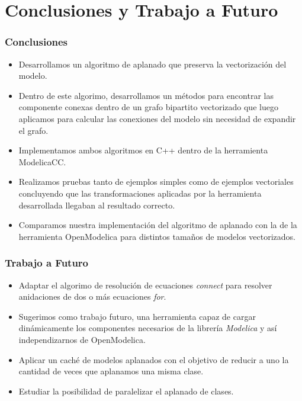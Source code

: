\section{Conclusiones y Trabajo a Futuro}
\begin{frame}
\frametitle{Conclusiones}
\begin{itemize}
 \item Desarrollamos un algoritmo de aplanado que preserva la vectorización del modelo.
 \item Dentro de este algorimo, desarrollamos un métodos para encontrar las componente conexas dentro de un grafo bipartito vectorizado que luego aplicamos para calcular las conexiones del modelo sin necesidad de expandir el grafo.
 \item Implementamos ambos algoritmos en C++ dentro de la herramienta ModelicaCC.
 \item Realizamos pruebas tanto de ejemplos simples como de ejemplos vectoriales concluyendo que las transformaciones aplicadas por la herramienta desarrollada llegaban al resultado correcto.
 \item Comparamos nuestra implementación del algoritmo de aplanado con la de la herramienta OpenModelica para distintos tamaños de modelos vectorizados.  
\end{itemize}
\end{frame}


\begin{frame}
\frametitle{Trabajo a Futuro}
\begin{itemize}
\item Adaptar el algorimo de resolución de ecuaciones \textit{connect} para resolver anidaciones de dos o más ecuaciones \textit{for}.

\item  Sugerimos como trabajo futuro, una herramienta capaz de cargar dinámicamente los componentes necesarios de la librería \textit{Modelica} y así independizarnos de OpenModelica.

\item Aplicar un caché de modelos aplanados con el objetivo de reducir a uno la cantidad de veces que aplanamos una misma clase.  

\item Estudiar la posibilidad de paralelizar el aplanado de clases.    
\end{itemize}
\end{frame}

